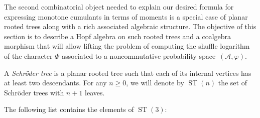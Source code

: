 \documentclass[11pt]{article}
\numberwithin{equation}{section}
\numberwithin{equation}{section}
\newcommand{\A}{\mathcal{A}}
\newcommand{\ST}{\operatorname{ST}}
\begin{document}
The second combinatorial object needed to explain our desired formula for expressing monotone cumulants in terms of moments is a special case of planar rooted trees along with a rich associated algebraic structure. The objective of this section is to describe a Hopf algebra on such rooted trees and a coalgebra morphism that will allow lifting the problem of computing the shuffle logarithm of the character $\Phi$ associated to a noncommutative probability space~$(\A,\varphi)$.

\begin{Definition}A \textit{Schr\"oder tree} is a planar rooted tree such that each of its internal vertices has at least two descendants. For any $n\geq0$, we will denote by $\ST(n)$ the set of Schr\"oder trees with $n+1$ leaves.
\end{Definition}
\begin{Example}
The following list contains the elements of $\ST(3)$:


\end{Example}
\end{document}
